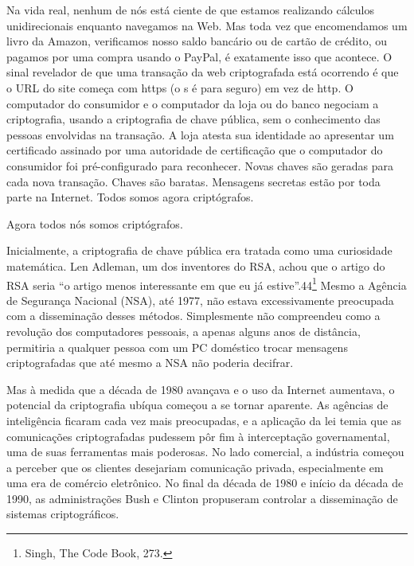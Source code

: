 \documentclass{book}
\begin{document}
Na vida real, nenhum de nós está ciente de que estamos realizando cálculos unidirecionais enquanto navegamos na Web. Mas toda vez que encomendamos um livro da Amazon, verificamos nosso saldo bancário ou de cartão de crédito, ou pagamos por uma compra usando o PayPal, é exatamente isso que acontece. O sinal revelador de que uma transação da web criptografada está ocorrendo é que o URL do site começa com https (o s é para seguro) em vez de http. O computador do consumidor e o computador da loja ou do banco negociam a criptografia, usando a criptografia de chave pública, sem o conhecimento das pessoas envolvidas na transação. A loja atesta sua identidade ao apresentar um certificado assinado por uma autoridade de certificação que o computador do consumidor foi pré-configurado para reconhecer. Novas chaves são geradas para cada nova transação. Chaves são baratas. Mensagens secretas estão por toda parte na Internet. Todos somos agora criptógrafos.

Agora todos nós somos criptógrafos.

Inicialmente, a criptografia de chave pública era tratada como uma curiosidade matemática. Len Adleman, um dos inventores do RSA, achou que o artigo do RSA seria ``o artigo menos interessante em que eu já estive''.44\footnote{Singh, The Code Book, 273.} Mesmo a Agência de Segurança Nacional (NSA), até 1977, não estava excessivamente preocupada com a disseminação desses métodos. Simplesmente não compreendeu como a revolução dos computadores pessoais, a apenas alguns anos de distância, permitiria a qualquer pessoa com um PC doméstico trocar mensagens criptografadas que até mesmo a NSA não poderia decifrar.

Mas à medida que a década de 1980 avançava e o uso da Internet aumentava, o potencial da criptografia ubíqua começou a se tornar aparente. As agências de inteligência ficaram cada vez mais preocupadas, e a aplicação da lei temia que as comunicações criptografadas pudessem pôr fim à interceptação governamental, uma de suas ferramentas mais poderosas. No lado comercial, a indústria começou a perceber que os clientes desejariam comunicação privada, especialmente em uma era de comércio eletrônico. No final da década de 1980 e início da década de 1990, as administrações Bush e Clinton propuseram controlar a disseminação de sistemas criptográficos.
\end{document}
